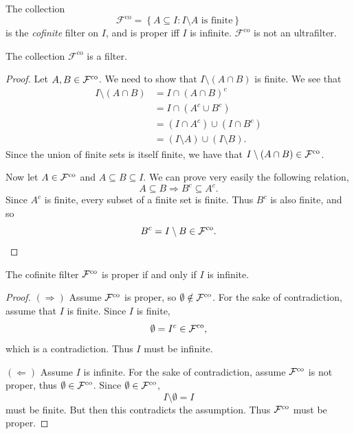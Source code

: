 {\begin{defn}
The collection
\[
\mathcal{F}^{\mathrm{co}}
=
\left\{
A \subseteq I : I \setminus A \text{ is finite}
\right\}
\]
is the \emph{cofinite} filter on \(I\), and is proper iff \(I\) is infinite.
\(\mathcal{F}^{\mathrm{co}}\) is not an ultrafilter.
\end{defn}

\begin{prop}
The collection \(\mathcal{F}^{\mathrm{co}}\) is a filter.
\end{prop}

\begin{proof}
Let \(A, B \in \mathcal{F}^{\mathrm{co}}\). We need to show that
\(I \setminus (A \cap B)\) is finite. We see that
\begin{align*}
    I \setminus (A \cap B)
    & = I \cap (A \cap B)^c \\
    & = I \cap (A^c \cup B^c) \\
    & = (I \cap A^c) \cup (I \cap B^c) \\
    & = (I \setminus A) \cup (I \setminus B).
\end{align*}
Since the union of finite sets is itself finite, we have that
\(I \setminus (A \cap B) \in \mathcal{F}^{\mathrm{co}}\).

Now let \(A \in \mathcal{F}^{\mathrm{co}}\) and \(A \subseteq B \subseteq I\).
We can prove very easily the following relation,
\[
A \subseteq B \Rightarrow B^c \subseteq A^c.
\]
Since \(A^c\) is finite, every subset of a finite set is finite. Thus
\(B^c\) is also finite, and so
\[
B^c=I\setminus B \in \mathcal{F}^{\mathrm{co}}.
\]
\end{proof}

\begin{prop}
The cofinite filter \(\mathcal{F}^{\mathrm{co}}\) is proper if and only if
\(I\) is infinite.
\end{prop}

\begin{proof}
\noindent\((\Rightarrow)\)
Assume \(\mathcal{F}^{\mathrm{co}}\) is proper, so
\(\emptyset \notin \mathcal{F}^{\mathrm{co}}\). For the sake of contradiction,
assume that \(I\) is finite. Since \(I\) is
finite,
\[
\emptyset = I^c \in \mathcal{F}^{\mathrm{co}},
\]
which is a contradiction. Thus \(I\) must be infinite.

\noindent\((\Leftarrow)\)
Assume \(I\) is infinite. For the sake of contradiction, assume
\(\mathcal{F}^{\mathrm{co}}\) is not proper, thus
\(\emptyset \in \mathcal{F}^{\mathrm{co}}\). Since
\(\emptyset \in \mathcal{F}^{\mathrm{co}}\),
\[
I \setminus \emptyset=I
\]
must be finite. But then this contradicts the assumption. Thus
\(\mathcal{F}^{\mathrm{co}}\) must be proper.
\end{proof}

}
